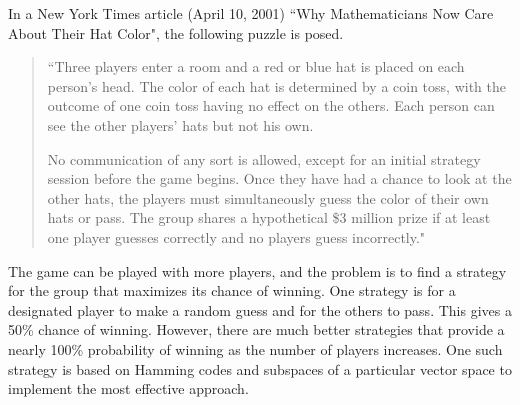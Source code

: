  \label{sec:vector_spaces}

\vspace*{-17 pt}

\vspace*{13 pt}


In a New York Times article (April 10, 2001) ``Why Mathematicians Now Care About Their Hat Color", the following puzzle is posed.
\begin{quote} ``Three players enter a room and a red or blue hat is placed on each person's head. The color of each hat is determined by a coin toss, with the outcome of one coin toss having no effect on the others. Each person can see the other players' hats but not his own.

No communication of any sort is allowed, except for an initial strategy session before the game begins. Once they have had a chance to look at the other hats, the players must simultaneously guess the color of their own hats or pass. The group shares a hypothetical \$3 million prize if at least one player guesses correctly and no players guess incorrectly."
\end{quote}

The game can be played with more players, and the problem is to find a strategy for the group that maximizes its chance of winning. One strategy is for a designated player to make a random guess and for the others to pass. This gives a 50\% chance of winning. However, there are much better strategies that provide a nearly 100\% probability of winning as the number of players increases. One such strategy is based on Hamming codes and subspaces of a particular vector space to implement the most effective approach. 


